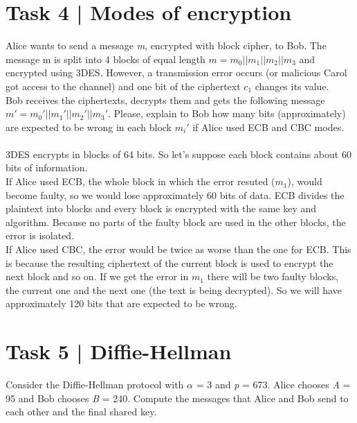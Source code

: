 \documentclass{article}
\begin{document}
\section*{Task 4 | Modes of encryption}
Alice wants to send a message \textit{m}, encrypted with block cipher, to Bob. The message m
is split into 4 blocks of equal length $m = m_0||m_1||m_2||m_3$ and encrypted using 3DES.
However, a transmission error occurs (or malicious Carol got access to the channel) and
one bit of the ciphertext $c_1$ changes its value. \\
Bob receives the ciphertexts, decrypts them and gets the following message 
$m' = m_0'||m_1'||m_2'||m_3'$. 
Please, explain to Bob how many bits (approximately) are expected to
be wrong in each block $m_i'$ if Alice used ECB and CBC modes. \\\\
3DES encrypts in blocks of 64 bits. So let's suppose each block contains about 60 bits of information. \\
If Alice used ECB, the whole block in which the error resuted ($m_1$), would
become faulty, so we would lose approximately 60 bits of data. ECB divides the plaintext
into blocks and every block is encrypted with the same key and algorithm. Because no parts
of the faulty block are used in the other blocks, the error is isolated. \\
If Alice used CBC, the error would be twice as worse than the one for ECB. This is because the
resulting ciphertext of the current block is used to encrypt the next block and so on. If
we get the error in $m_1$ there will be two faulty blocks, the current one and the next one (the text is being decrypted).
So we will have approximately 120 bits that are expected to be wrong.


\section*{Task 5 | Diffie-Hellman}
Consider the Diffie-Hellman protocol with $\alpha$ = 3 and \textit{p} = 673. Alice chooses
\textit{A} = 95 and Bob chooses \textit{B} = 240. Compute the messages that Alice and Bob
send to each other and the final shared key.
\end{document}
